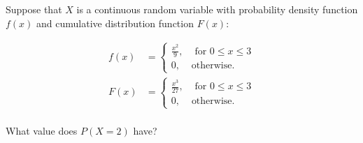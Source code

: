 Suppose that $X$ is a continuous random variable with probability density function $f(x)$ and cumulative distribution function $F(x)$:

\begin{align*}
    f(x) &= \begin{cases} \frac{x^2}{9}, & \text{ for } 0 \leq x \leq 3 \\ 0, & \text{otherwise.} \end{cases} \\
    F(x) &= \begin{cases} \frac{x^3}{27}, & \text{ for } 0 \leq x \leq 3 \\ 0, & \text{otherwise.} \end{cases} \\
\end{align*}

What value does $P(X = 2)$ have?